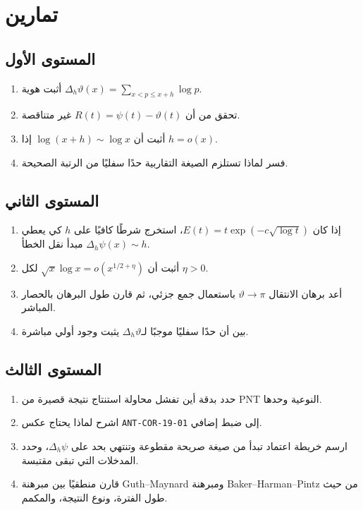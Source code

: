 \section{تمارين}

\subsection{المستوى الأول}
\begin{enumerate}
  \item أثبت هوية \(\Delta_h\vartheta(x)=\sum_{x<p\le x+h}\log p\).
  \item تحقق من أن \(R(t)=\psi(t)-\vartheta(t)\) غير متناقصة.
  \item أثبت أن \(\log(x+h)\sim\log x\) إذا \(h=o(x)\).
  \item فسر لماذا تستلزم الصيغة التقاربية حدًا سفليًا من الرتبة الصحيحة.
\end{enumerate}

\subsection{المستوى الثاني}
\begin{enumerate}
  \item إذا كان \(E(t)=t\exp(-c\sqrt{\log t})\)، استخرج شرطًا كافيًا على \(h\) كي يعطي مبدأ نقل الخطأ \(\Delta_h\psi(x)\sim h\).
  \item أثبت أن \(\sqrt{x}\log x=o(x^{1/2+\eta})\) لكل \(\eta>0\).
  \item أعد برهان الانتقال \(\vartheta\to\pi\) باستعمال جمع جزئي، ثم قارن طول البرهان بالحصار المباشر.
  \item بين أن حدًا سفليًا موجبًا لـ\(\Delta_h\vartheta\) يثبت وجود أولي مباشرة.
\end{enumerate}

\subsection{المستوى الثالث}
\begin{enumerate}
  \item حدد بدقة أين تفشل محاولة استنتاج نتيجة قصيرة من PNT النوعية وحدها.
  \item اشرح لماذا يحتاج عكس \textenglish{\texttt{ANT-COR-19-01}} إلى ضبط إضافي.
  \item ارسم خريطة اعتماد تبدأ من صيغة صريحة مقطوعة وتنتهي بحد على \(\Delta_h\psi\)، وحدد المدخلات التي تبقى مقتبسة.
  \item قارن منطقيًا بين مبرهنة Guth--Maynard ومبرهنة Baker--Harman--Pintz من حيث طول الفترة، ونوع النتيجة، والمكمم.
\end{enumerate}

